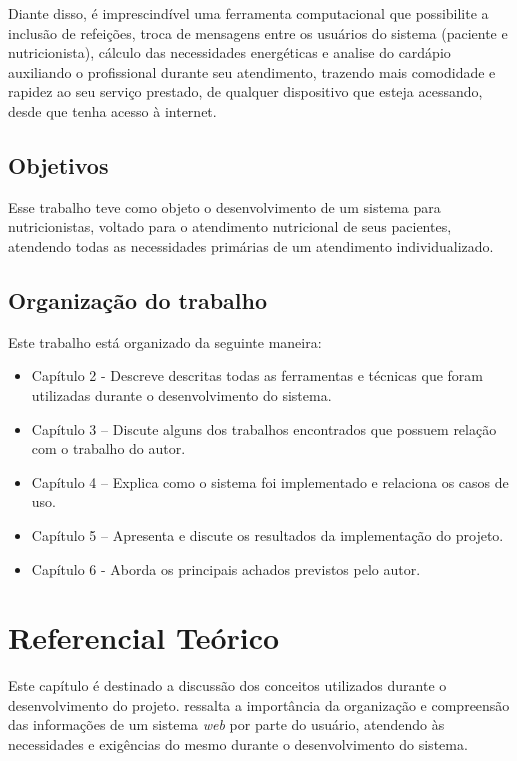 \documentclass[
	12pt,				%
    oneside,			%
	a4paper,			%
	english,			%
	french,				%
	spanish,			%
	brazil,				%
	]{abntex2}
\begin{document}
Diante disso, é imprescindível uma ferramenta computacional que possibilite a inclusão de refeições, troca de mensagens entre
os usuários do sistema (paciente e nutricionista), 
cálculo das necessidades energéticas e analise do
cardápio auxiliando o profissional durante seu atendimento, trazendo mais
comodidade e rapidez ao seu serviço prestado, de qualquer dispositivo que esteja acessando, desde
que tenha acesso à internet.

\section{Objetivos}

Esse trabalho teve como objeto o desenvolvimento de um sistema para
nutricionistas, voltado para o atendimento nutricional de seus pacientes, atendendo
todas as necessidades primárias de um atendimento individualizado.

\section{Organização do trabalho}
Este trabalho está organizado da seguinte maneira:

 \begin{itemize}

	\item Capítulo 2 - Descreve descritas todas as ferramentas e técnicas que foram utilizadas durante o desenvolvimento do sistema.
	\item Capítulo 3 – Discute alguns dos trabalhos encontrados que possuem relação com o trabalho do autor.
	\item Capítulo 4 – Explica como o sistema foi implementado e relaciona os casos de uso.
	\item Capítulo 5 – Apresenta e discute os resultados da implementação do projeto.
	\item Capítulo 6 - Aborda os principais achados previstos pelo autor.

\end{itemize}

\chapter{Referencial Teórico}

Este capítulo é destinado a discussão dos conceitos utilizados durante o desenvolvimento do projeto.  ressalta a importância da organização e compreensão das informações de um sistema \textit{web} por parte do usuário, atendendo às necessidades e exigências do mesmo durante o desenvolvimento do sistema.
\end{document}
